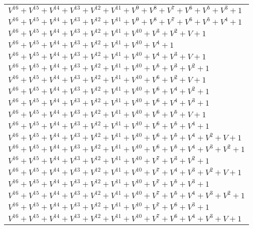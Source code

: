\documentclass[12pt]{article}
\begin{document}
\begin{adjustwidth}{-4cm}{}
\begin{center}
\begin{longtable}{|l|}
$V^{16}  +V^{15}  +V^{14}  +V^{13}  +V^{12}  +V^{11}  +V^{9}  +V^{8}  +V^{7}  +V^{6}  +V^{5}  +V^{3}  + 1$ \\
$V^{16}  +V^{15}  +V^{14}  +V^{13}  +V^{12}  +V^{11}  +V^{9}  +V^{8}  +V^{7}  +V^{6}  +V^{5}  +V^{4}  + 1$ \\
$V^{16}  +V^{15}  +V^{14}  +V^{13}  +V^{12}  +V^{11}  +V^{10}  +V^{3}  +V^{2}  + V + 1$ \\
$V^{16}  +V^{15}  +V^{14}  +V^{13}  +V^{12}  +V^{11}  +V^{10}  +V^{4}  + 1$ \\
$V^{16}  +V^{15}  +V^{14}  +V^{13}  +V^{12}  +V^{11}  +V^{10}  +V^{4}  +V^{3}  + V + 1$ \\
$V^{16}  +V^{15}  +V^{14}  +V^{13}  +V^{12}  +V^{11}  +V^{10}  +V^{5}  +V^{3}  +V^{2}  + 1$ \\
$V^{16}  +V^{15}  +V^{14}  +V^{13}  +V^{12}  +V^{11}  +V^{10}  +V^{6}  +V^{2}  + V + 1$ \\
$V^{16}  +V^{15}  +V^{14}  +V^{13}  +V^{12}  +V^{11}  +V^{10}  +V^{6}  +V^{4}  +V^{2}  + 1$ \\
$V^{16}  +V^{15}  +V^{14}  +V^{13}  +V^{12}  +V^{11}  +V^{10}  +V^{6}  +V^{4}  +V^{3}  + 1$ \\
$V^{16}  +V^{15}  +V^{14}  +V^{13}  +V^{12}  +V^{11}  +V^{10}  +V^{6}  +V^{5}  + V + 1$ \\
$V^{16}  +V^{15}  +V^{14}  +V^{13}  +V^{12}  +V^{11}  +V^{10}  +V^{6}  +V^{5}  +V^{4}  + 1$ \\
$V^{16}  +V^{15}  +V^{14}  +V^{13}  +V^{12}  +V^{11}  +V^{10}  +V^{6}  +V^{5}  +V^{4}  +V^{2}  + V + 1$ \\
$V^{16}  +V^{15}  +V^{14}  +V^{13}  +V^{12}  +V^{11}  +V^{10}  +V^{6}  +V^{5}  +V^{4}  +V^{3}  +V^{2}  + 1$ \\
$V^{16}  +V^{15}  +V^{14}  +V^{13}  +V^{12}  +V^{11}  +V^{10}  +V^{7}  +V^{3}  +V^{2}  + 1$ \\
$V^{16}  +V^{15}  +V^{14}  +V^{13}  +V^{12}  +V^{11}  +V^{10}  +V^{7}  +V^{4}  +V^{3}  +V^{2}  + V + 1$ \\
$V^{16}  +V^{15}  +V^{14}  +V^{13}  +V^{12}  +V^{11}  +V^{10}  +V^{7}  +V^{5}  +V^{3}  + 1$ \\
$V^{16}  +V^{15}  +V^{14}  +V^{13}  +V^{12}  +V^{11}  +V^{10}  +V^{7}  +V^{5}  +V^{4}  +V^{3}  +V^{2}  + 1$ \\
$V^{16}  +V^{15}  +V^{14}  +V^{13}  +V^{12}  +V^{11}  +V^{10}  +V^{7}  +V^{6}  +V^{3}  + 1$ \\
$V^{16}  +V^{15}  +V^{14}  +V^{13}  +V^{12}  +V^{11}  +V^{10}  +V^{7}  +V^{6}  +V^{4}  +V^{3}  + V + 1$ \\

\end{longtable}
\end{center}
\end{adjustwidth}
\end{document}
